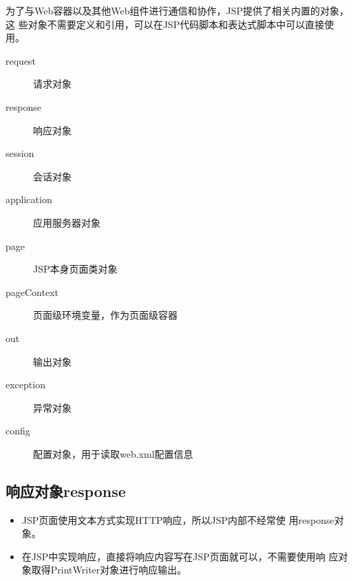 为了与Web容器以及其他Web组件进行通信和协作，JSP提供了相关内置的对象，这
些对象不需要定义和引用，可以在JSP代码脚本和表达式脚本中可以直接使用。

\begin{description}
\item[request] 请求对象
\item[response] 响应对象
\item[session] 会话对象
\item[application] 应用服务器对象
\item[page] JSP本身页面类对象
\item[pageContext] 页面级环境变量，作为页面级容器
\item[out] 输出对象
\item[exception] 异常对象
\item[config] 配置对象，用于读取web.xml配置信息
\end{description}

%
\subsection{响应对象response} 

\begin{itemize}
\item JSP页面使用文本方式实现HTTP响应，所以JSP内部不经常使
  用response对象。
\item 在JSP中实现响应，直接将响应内容写在JSP页面就可以，不需要使用响
  应对象取得PrintWriter对象进行响应输出。
\end{itemize}

